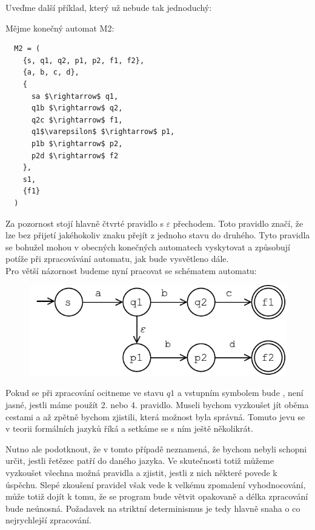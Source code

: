 \noindent
Uveďme další příklad, který už nebude tak jednoduchý:
\begin{exmp}
  Mějme konečný automat M2:
  \begin{lstlisting}
  M2 = (
    {s, q1, q2, p1, p2, f1, f2},
    {a, b, c, d},
    {
      sa $\rightarrow$ q1,
      q1b $\rightarrow$ q2,
      q2c $\rightarrow$ f1,
      q1$\varepsilon$ $\rightarrow$ p1,
      p1b $\rightarrow$ p2,
      p2d $\rightarrow$ f2
    },
    s1,
    {f1}
  )
  \end{lstlisting}

  Za pozornost stojí hlavně čtvrté pravidlo s $\varepsilon$ přechodem.
  Toto pravidlo značí, že lze bez přijetí jakéhokoliv znaku přejít z jednoho stavu
  do druhého. Tyto pravidla se bohužel mohou v obecných konečných automatech vyskytovat a
  způsobují potíže při zpracovávání automatu, jak bude vysvětleno dále.\\

  \noindent
  Pro větší názornost budeme nyní pracovat se schématem automatu:

  \begin{figure}[H]
    \centering
    \includegraphics{fig/finiteAutomat1.pdf}
  \end{figure}

  Pokud se při zpracování ocitneme ve stavu $q1$ a vstupním symbolem bude ,
  není jasné, jestli máme použít 2. nebo 4. pravidlo. Museli bychom vyzkoušet jít oběma cestami
  a až zpětně bychom zjistili, která možnost byla správná. Tomuto jevu se v teorii
  formálních jazyků říká  a setkáme
  se s ním ještě několikrát.\\
\end{exmp}

  Nutno ale podotknout, že v tomto případě  neznamená,
  že bychom nebyli schopni
  určit, jestli řetězec patří do daného jazyka. Ve skutečnosti totiž můžeme
  vyzkoušet všechna možná pravidla a zjistit, jestli z nich některé povede k úspěchu.
  Slepé zkoušení pravidel však vede k velkému zpomalení vyhodnocování,
  může totiž dojít k tomu, že se program bude větvit opakovaně
  a délka zpracování bude neúnosná. Požadavek na striktní determinismus
  je tedy hlavně snaha o co nejrychlejší zpracování.


